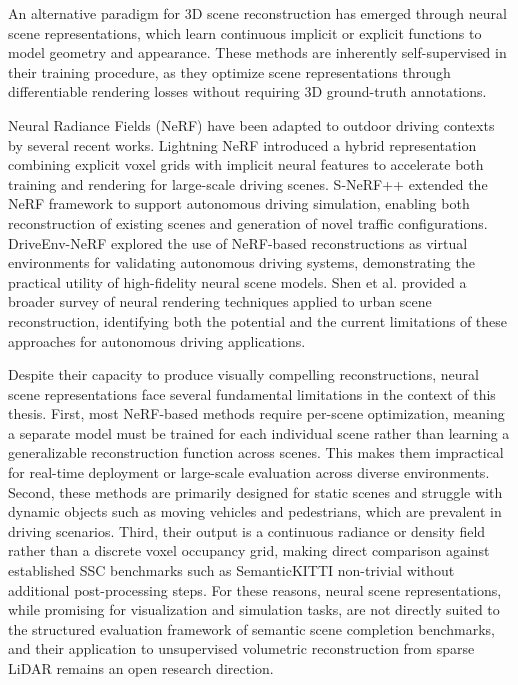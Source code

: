 \documentclass[a4paper, 12pt]{article}
\begin{document}
	An alternative paradigm for 3D scene reconstruction has emerged through neural
	scene representations, which learn continuous implicit or explicit functions to
	model geometry and appearance. These methods are inherently self-supervised in
	their training procedure, as they optimize scene representations through
	differentiable rendering losses without requiring 3D ground-truth annotations.
	
	Neural Radiance Fields (NeRF) have been adapted to outdoor driving contexts
	by several recent works. Lightning NeRF \cite{10611130} introduced a hybrid
	representation combining explicit voxel grids with implicit neural features to
	accelerate both training and rendering for large-scale driving scenes. S-NeRF++
	\cite{10891659} extended the NeRF framework to support autonomous driving
	simulation, enabling both reconstruction of existing scenes and generation of
	novel traffic configurations. DriveEnv-NeRF
	\cite{shen2024driveenvnerfexplorationnerfbasedautonomous} explored the use of
	NeRF-based reconstructions as virtual environments for validating autonomous
	driving systems, demonstrating the practical utility of high-fidelity neural
	scene models. Shen et al. \cite{shen2024neuralrenderingbasedurban} provided a
	broader survey of neural rendering techniques applied to urban scene
	reconstruction, identifying both the potential and the current limitations of
	these approaches for autonomous driving applications.
	
	Despite their capacity to produce visually compelling reconstructions, neural
	scene representations face several fundamental limitations in the context of
	this thesis. First, most NeRF-based methods require per-scene optimization,
	meaning a separate model must be trained for each individual scene rather than
	learning a generalizable reconstruction function across scenes. This makes
	them impractical for real-time deployment or large-scale evaluation across
	diverse environments. Second, these methods are primarily designed for static
	scenes and struggle with dynamic objects such as moving vehicles and
	pedestrians, which are prevalent in driving scenarios. Third, their output is a
	continuous radiance or density field rather than a discrete voxel occupancy
	grid, making direct comparison against established SSC benchmarks such as
	SemanticKITTI non-trivial without additional post-processing steps. For these
	reasons, neural scene representations, while promising for visualization and
	simulation tasks, are not directly suited to the structured evaluation framework
	of semantic scene completion benchmarks, and their application to unsupervised
	volumetric reconstruction from sparse LiDAR remains an open research direction.
	
\end{document}
